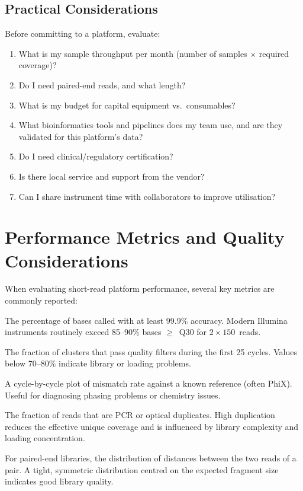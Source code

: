 \subsection{Practical Considerations}

\begin{protocolbox}[title={Platform Selection Checklist}]
Before committing to a platform, evaluate:
\begin{enumerate}[nosep]
  \item What is my sample throughput per month (number of samples $\times$ required coverage)?
  \item Do I need paired-end reads, and what length?
  \item What is my budget for capital equipment vs.\ consumables?
  \item What bioinformatics tools and pipelines does my team use, and are they validated for this platform's data?
  \item Do I need clinical/regulatory certification?
  \item Is there local service and support from the vendor?
  \item Can I share instrument time with collaborators to improve utilisation?
\end{enumerate}
\end{protocolbox}


\section{Performance Metrics and Quality Considerations}
\label{sec:quality_metrics}

When evaluating short-read platform performance, several key metrics are commonly reported:

\begin{description}[style=nextline, font=\bfseries]
  \item[Q30 (Phred score $\geq$ 30)] The percentage of bases called with at least 99.9\% accuracy. Modern Illumina instruments routinely exceed 85--90\% bases $\geq$~Q30 for $2 \times 150$\basepair\ reads.

  \item[Cluster passing filter (\%PF)] The fraction of clusters that pass quality filters during the first 25 cycles. Values below 70--80\% indicate library or loading problems.

  \item[Error rate by cycle] A cycle-by-cycle plot of mismatch rate against a known reference (often PhiX). Useful for diagnosing phasing problems or chemistry issues.

  \item[Duplication rate] The fraction of reads that are PCR or optical duplicates. High duplication reduces the effective unique coverage and is influenced by library complexity and loading concentration.

  \item[Insert size distribution] For paired-end libraries, the distribution of distances between the two reads of a pair. A tight, symmetric distribution centred on the expected fragment size indicates good library quality.
\end{description}

